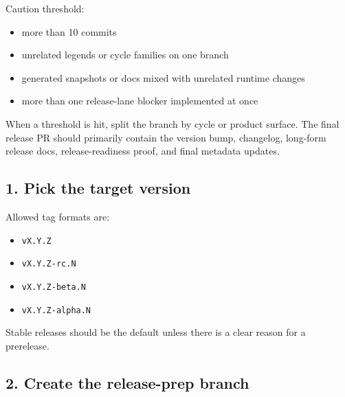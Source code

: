 Caution threshold:

\begin{itemize}
\tightlist
\item
  more than 10 commits
\item
  unrelated legends or cycle families on one branch
\item
  generated snapshots or docs mixed with unrelated runtime changes
\item
  more than one release-lane blocker implemented at once
\end{itemize}

When a threshold is hit, split the branch by cycle or product surface. The final release PR should primarily contain the version bump, changelog, long-form release docs, release-readiness proof, and final metadata updates.

\subsection{1. Pick the target version}\label{record-274-pick-the-target-version}

Allowed tag formats are:

\begin{itemize}
\tightlist
\item
  \texttt{v\allowbreak{}X\allowbreak{}.\allowbreak{}Y\allowbreak{}.\allowbreak{}Z}
\item
  \texttt{v\allowbreak{}X\allowbreak{}.\allowbreak{}Y\allowbreak{}.\allowbreak{}Z\allowbreak{}-\allowbreak{}r\allowbreak{}c\allowbreak{}.\allowbreak{}N}
\item
  \texttt{v\allowbreak{}X\allowbreak{}.\allowbreak{}Y\allowbreak{}.\allowbreak{}Z\allowbreak{}-\allowbreak{}b\allowbreak{}e\allowbreak{}t\allowbreak{}a\allowbreak{}.\allowbreak{}N}
\item
  \texttt{v\allowbreak{}X\allowbreak{}.\allowbreak{}Y\allowbreak{}.\allowbreak{}Z\allowbreak{}-\allowbreak{}a\allowbreak{}l\allowbreak{}p\allowbreak{}h\allowbreak{}a\allowbreak{}.\allowbreak{}N}
\end{itemize}

Stable releases should be the default unless there is a clear reason for a prerelease.

\subsection{2. Create the release-prep branch}\label{record-274-create-the-release-prep-branch}

